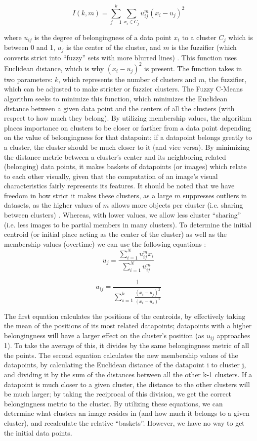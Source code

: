 \documentclass[10pt,twocolumn]{article}
\begin{document}
\[ I(k, m)  =  \sum_{j=1}^{k} \sum_{x_i \in C_j} u_{ij}^{m}(x_i - u_j)^2 \]

where \(u_{ij}\) is the degree of belongingness of a data point \(x_i \) to a cluster \(C_j \) which is between 0 and 1, \(u_j \) is the center of the cluster, and \(m \) is the fuzzifier (which converts strict into “fuzzy” sets with more blurred lines) \cite{PrasadClustering}. This function uses Euclidean distance, which is why \((x_i - u_j)^2 \) is present. The function takes in two parameters: \(k\), which represents the number of clusters and \(m \), the fuzzifier, which can be adjusted to make stricter or fuzzier clusters. The Fuzzy C-Means algorithm seeks to minimize this function, which minimizes the Euclidean distance between a given data point and the centers of all the clusters (with respect to how much they belong). By utilizing membership values, the algorithm places importance on clusters to be closer or farther from a data point depending on the value of belongingness for that datapoint; if a datapoint belongs greatly to a cluster, the cluster should be much closer to it (and vice versa). By minimizing the distance metric between a cluster’s center and its neighboring related (belonging) data points, it makes baskets of datapoints (or images) which relate to each other visually, given that the computation of an image's visual characteristics fairly represents its features. It should be noted that we have freedom in how strict it makes these clusters, as a large \(m \) suppresses outliers in datasets, as the higher values of \(m \) allows more objects per cluster (i.e. sharing between clusters) \cite{Schwammle2010}. Whereas, with lower values, we allow less cluster “sharing” (i.e. less images to be partial members in many clusters). To determine the initial centroid (or initial place acting as the center of the cluster) as well as the membership values (overtime) we can use the following equations \cite{Schwammle2010}: 
\[u_j = \frac{\sum_{i=1}^N u_{ij}^m x_i}{\sum_{i=1}^Nu_{ij}^m}\] 

\[u_{ij} = \frac{1}{\sum_{s=1}^k \frac{(x_i - u_j)^2}{(x_i - u_s)^2} }\] 

The first equation calculates the positions of the centroids, by effectively taking the mean of the positions of its most related datapoints; datapoints with a higher belongingness will have a larger effect on the cluster's position (as \(u_{ij}\) approaches 1). To take the average of this, it divides by the same belongingness metric of all the points.
The second equation calculates the new membership values of the datapoints, by calculating the Euclidean distance of the datapoint i to cluster j, and dividing it by the sum of the distances between all the other k-1 clusters. If a datapoint is much closer to a given cluster, the distance to the other clusters will be much larger; by taking the reciprocal of this division, we get the correct belongingness metric to the cluster. By utilizing these equations, we can determine what clusters an image resides in (and how much it belongs to a given cluster), and recalculate the relative “baskets”. However, we have no way to get the initial data points.
\end{document}

